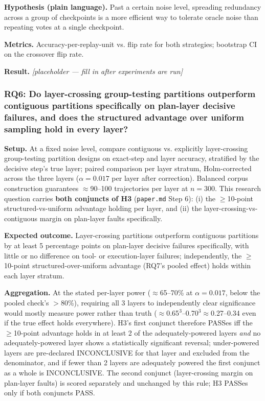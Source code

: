 \documentclass[11pt]{article}
\newcommand{\ph}{\textit{[placeholder --- fill in after experiments are run]}}
\begin{document}
\textbf{Hypothesis (plain language).} Past a certain noise level, spreading redundancy across a group of checkpoints is a more efficient way to tolerate oracle noise than repeating votes at a single checkpoint.

\textbf{Metrics.} Accuracy-per-replay-unit vs. flip rate for both strategies; bootstrap CI on the crossover flip rate.

\textbf{Result.} \ph

\subsubsection{RQ6: Do layer-crossing group-testing partitions outperform contiguous partitions specifically on plan-layer decisive failures, and does the structured advantage over uniform sampling hold in every layer?}
\textbf{Setup.} At a fixed noise level, compare contiguous vs. explicitly layer-crossing group-testing partition designs on exact-step and layer accuracy, stratified by the decisive step's true layer; paired comparison per layer stratum, Holm-corrected across the three layers ($\alpha=0.017$ per layer after correction). Balanced corpus construction guarantees $\approx$90--100 trajectories per layer at $n=300$. This research question carries \textbf{both conjuncts of H3} (\texttt{paper.md} Step 6): (i) the $\geq$10-point structured-vs-uniform advantage holding per layer, and (ii) the layer-crossing-vs-contiguous margin on plan-layer faults specifically.

\textbf{Expected outcome.} Layer-crossing partitions outperform contiguous partitions by at least 5 percentage points on plan-layer decisive failures specifically, with little or no difference on tool- or execution-layer failures; independently, the $\geq$10-point structured-over-uniform advantage (RQ7's pooled effect) holds within each layer stratum.

\textbf{Aggregation.} At the stated per-layer power ($\approx$65--70\% at $\alpha=0.017$, below the pooled check's $>$80\%), requiring all 3 layers to independently clear significance would mostly measure power rather than truth ($\approx$0.65$^3$--0.70$^3\approx$0.27--0.34 even if the true effect holds everywhere). H3's first conjunct therefore PASSes iff the $\geq$10-point advantage holds in at least 2 of the adequately-powered layers \emph{and} no adequately-powered layer shows a statistically significant reversal; under-powered layers are pre-declared INCONCLUSIVE for that layer and excluded from the denominator, and if fewer than 2 layers are adequately powered the first conjunct as a whole is INCONCLUSIVE. The second conjunct (layer-crossing margin on plan-layer faults) is scored separately and unchanged by this rule; H3 PASSes only if both conjuncts PASS.
\end{document}
